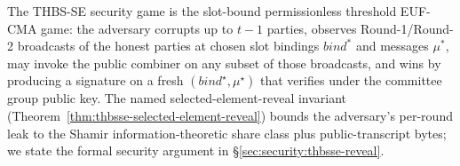 The THBS-SE security game is the slot-bound permissionless
threshold EUF-CMA game: the adversary corrupts up to $t-1$
parties, observes Round-1/Round-2 broadcasts of the honest
parties at chosen slot bindings $\mathit{bind}^*$ and messages
$\mu^*$, may invoke the public combiner on any subset of those
broadcasts, and wins by producing a signature on a fresh
$(\mathit{bind}^\star, \mu^\star)$ that verifies under the
committee group public key. The named selected-element-reveal
invariant
(Theorem~\ref{thm:thbsse-selected-element-reveal}) bounds the
adversary's per-round leak to the
Shamir information-theoretic share class plus public-transcript
bytes; we state the formal security argument in
\S\ref{sec:security:thbsse-reveal}.
